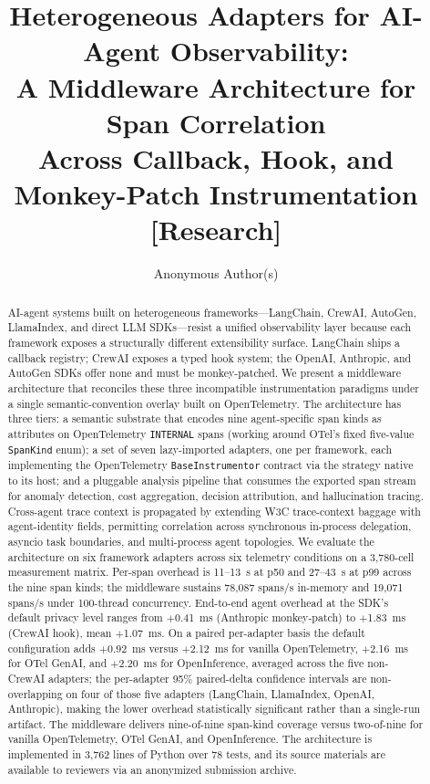 \documentclass[sigconf,review,anonymous,9pt]{acmart}
\title[Heterogeneous Adapters for AI-Agent Observability]{Heterogeneous Adapters for AI-Agent Observability:\\A Middleware Architecture for Span Correlation\\Across Callback, Hook, and Monkey-Patch Instrumentation\\\normalsize{[Research]}}
\author{Anonymous Author(s)}
\affiliation{%
  \institution{Submission \#XXX}
  \city{}
  \country{}
}
\begin{document}
\begin{abstract}
\sloppy
AI-agent systems built on heterogeneous frameworks---LangChain, CrewAI,
AutoGen, LlamaIndex, and direct LLM SDKs---resist a unified
observability layer because each framework exposes a structurally
different extensibility surface. LangChain ships a callback registry;
CrewAI exposes a typed hook system; the OpenAI, Anthropic, and AutoGen
SDKs offer none and must be monkey-patched. We present a middleware
architecture that reconciles these three incompatible instrumentation
paradigms under a single semantic-convention overlay built on
OpenTelemetry. The architecture has three tiers: a semantic substrate
that encodes nine agent-specific span kinds as attributes on
OpenTelemetry \texttt{INTERNAL} spans (working around OTel's fixed
five-value \texttt{SpanKind} enum); a set of seven lazy-imported
adapters, one per framework, each implementing the OpenTelemetry
\texttt{BaseInstrumentor} contract via the strategy native to its host;
and a pluggable analysis pipeline that consumes the exported span
stream for anomaly detection, cost aggregation, decision attribution,
and hallucination tracing. Cross-agent trace context is propagated by
extending W3C trace-context baggage with agent-identity fields,
permitting correlation across synchronous in-process delegation,
asyncio task boundaries, and multi-process agent topologies. We
evaluate the architecture on six framework adapters across six
telemetry conditions on a 3{,}780-cell measurement matrix. Per-span
overhead is 11--13~\textmu s at p50 and 27--43~\textmu s at p99 across
the nine span kinds; the middleware sustains 78{,}087 spans/s
in-memory and 19{,}071 spans/s under 100-thread concurrency.
End-to-end agent overhead at the SDK's default privacy level ranges
from $+$0.41~ms (Anthropic monkey-patch) to $+$1.83~ms (CrewAI hook),
mean $+$1.07~ms. On a paired per-adapter basis the default
configuration adds $+$0.92~ms versus $+$2.12~ms for vanilla
OpenTelemetry, $+$2.16~ms for OTel GenAI, and $+$2.20~ms for
OpenInference, averaged across the five non-CrewAI adapters; the
per-adapter 95\% paired-delta confidence intervals are non-overlapping
on four of those five adapters (LangChain, LlamaIndex, OpenAI,
Anthropic), making the lower overhead statistically significant
rather than a single-run artifact. The middleware delivers
nine-of-nine span-kind coverage versus two-of-nine for vanilla
OpenTelemetry, OTel GenAI, and OpenInference. The architecture is
implemented in 3{,}762 lines of Python over 78 tests, and its source
materials are available to reviewers via an anonymized submission
archive.
\end{abstract}
\end{document}
